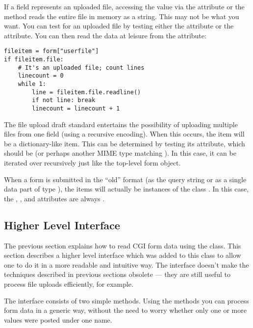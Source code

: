 If a field represents an uploaded file, accessing the value via the
 attribute or the  method reads the
entire file in memory as a string.  This may not be what you want.
You can test for an uploaded file by testing either the 
attribute or the  attribute.  You can then read the data at
leisure from the  attribute:

\begin{verbatim}
fileitem = form["userfile"]
if fileitem.file:
    # It's an uploaded file; count lines
    linecount = 0
    while 1:
        line = fileitem.file.readline()
        if not line: break
        linecount = linecount + 1
\end{verbatim}

The file upload draft standard entertains the possibility of uploading
multiple files from one field (using a recursive
 encoding).  When this occurs, the item will be
a dictionary-like  item.  This can be determined
by testing its  attribute, which should be
 (or perhaps another MIME type matching
).  In this case, it can be iterated over
recursively just like the top-level form object.

When a form is submitted in the ``old'' format (as the query string or
as a single data part of type
), the items will actually
be instances of the class .  In this case, the
, , and  attributes are
always .


\subsection{Higher Level Interface}


The previous section explains how to read CGI form data using the
 class.  This section describes a higher level
interface which was added to this class to allow one to do it in a
more readable and intuitive way.  The interface doesn't make the
techniques described in previous sections obsolete --- they are still
useful to process file uploads efficiently, for example.

The interface consists of two simple methods. Using the methods
you can process form data in a generic way, without the need to worry
whether only one or more values were posted under one name.

